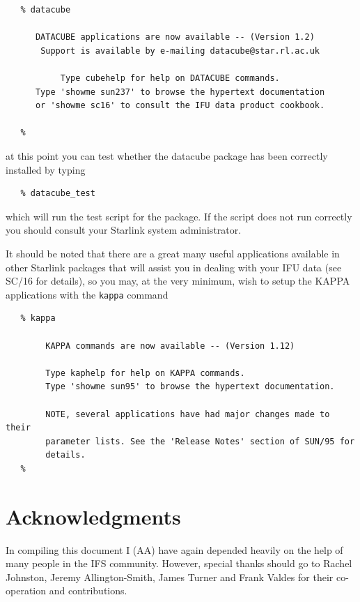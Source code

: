 \documentclass[twoside,11pt]{article}
\newcommand{\htmladdnormallink}[2]{#1}
\newcommand{\xref}[3]{#1}
\newcommand{\xlabel}[1]{}
\renewcommand{\_}{\texttt{\symbol{95}}}
\begin{document}
\small\begin{verbatim}
   % datacube

      DATACUBE applications are now available -- (Version 1.2)
       Support is available by e-mailing datacube@star.rl.ac.uk

           Type cubehelp for help on DATACUBE commands.
      Type 'showme sun237' to browse the hypertext documentation
      or 'showme sc16' to consult the IFU data product cookbook.

   %
\end{verbatim}\normalsize

at this point you can test whether the datacube package has been
correctly installed by typing

\small\begin{verbatim}
   % datacube_test
\end{verbatim}\normalsize

which will run the test script for the package. If the script does not
run correctly you should consult your Starlink system administrator.

It should be noted that there are a great many useful applications
available in other Starlink packages that will assist you in dealing
with your IFU data (see \xref{SC/16}{sc16}{} for details), so you may,
at the very minimum, wish to setup the \xref{KAPPA}{sun95}{}
applications with the {\tt kappa} command

\small\begin{verbatim}
   % kappa

        KAPPA commands are now available -- (Version 1.12)

        Type kaphelp for help on KAPPA commands.
        Type 'showme sun95' to browse the hypertext documentation.

        NOTE, several applications have had major changes made to their
        parameter lists. See the 'Release Notes' section of SUN/95 for
        details.
   %
\end{verbatim}\normalsize

\section*{\xlabel{sun237_acks}Acknowledgments\label{sun237_acks}}

In compiling this document I (AA) have again depended heavily on the help
of many people in the IFS community. However, special thanks should go
to \htmladdnormallink{Rachel
Johnston}{http://www.ast.cam.ac.uk/~raj/}, \htmladdnormallink{Jeremy
Allington-Smith}{http://star-www.dur.ac.uk:80/~jra/},
\htmladdnormallink{James Turner}{mailto:J.E.H.Turner@durham.ac.uk} and
\htmladdnormallink{Frank Valdes}{http://www.noao.edu/noao/scistaff/valdes.html} for their
co-operation and contributions.
\end{document}
